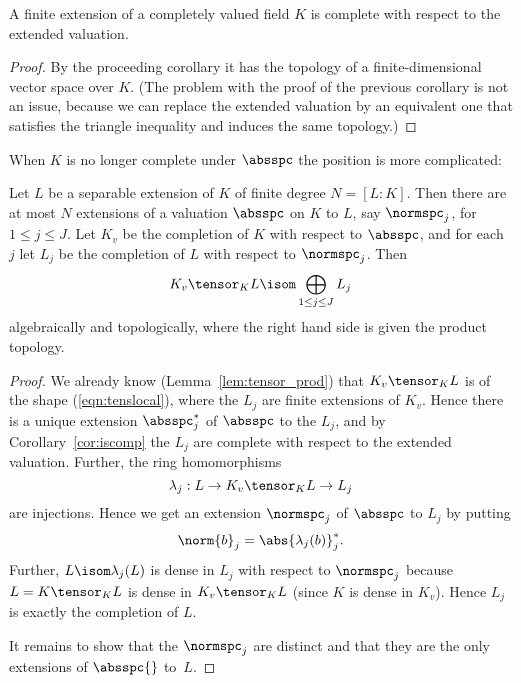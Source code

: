 \documentclass[11pt]{book}
\begin{document}
\begin{ch}
\begin{corollary}\label{cor:iscomp}
A finite extension of a completely valued field $K$ is complete
with respect to the extended valuation.
\end{corollary}
\begin{proof}
By the proceeding corollary it has the topology of a finite-dimensional
vector space over $K$. (The problem with the proof of the previous
corollary is not an issue, because we can replace the extended valuation
by an equivalent one that satisfies the triangle inequality and
induces the same topology.)
\end{proof}

When $K$ is no longer complete under $\absspc$ the position is more complicated:
\begin{theorem}\label{thm:extensions}
Let $L$ be a separable extension of $K$ of finite degree
  $N=[L:K]$.  Then there are at most $N$ extensions of a valuation
  $\absspc$ on $K$ to $L$, say $\normspc_j$, for $1\leq j \leq J$.
  Let $K_v$ be the completion of $K$ with respect to $\absspc$, and for
  each~$j$ let $L_j$ be the completion of $L$ with respect to
  $\normspc_j$.  Then
\begin{equation}\label{eqn:tenslocal}
  K_v \tensor_K L \isom \bigoplus_{1\leq j\leq J} L_j
\end{equation}
algebraically and topologically, where the right hand side is given
the product topology.
\end{theorem}
\begin{proof}
  We already know (Lemma~\ref{lem:tensor_prod}) that $K_v\tensor_K L$
  is of the shape (\ref{eqn:tenslocal}), where the $L_j$ are finite
  extensions of $K_v$.  Hence there is a unique extension
  $\absspc_j^*$ of $\absspc$ to the $L_j$, and by
  Corollary~\ref{cor:iscomp} the $L_j$ are complete with respect to
  the extended valuation.  Further,  the
  ring homomorphisms
  $$
  \lambda_j : L \to K_v\tensor_K L \to L_j
  $$
  are injections.   Hence we get an extension $\normspc_j$ of $\absspc$ to $L_j$ by putting
$$
\norm{b}_j = \abs{\lambda_j(b)}_j^*.
$$
Further, $L\isom \lambda_j(L)$ is dense in $L_j$ with respect to $\normspc_j$ because
$L = K\tensor_K L$ is dense in $K_v\tensor_K L$ (since $K$ is dense
in $K_v$).  Hence $L_j$ is exactly the completion of $L$.

It remains to show that the $\normspc_j$ are distinct and that they
are the only extensions of $\absspc{}$ to~$L$.


\end{proof}
\end{ch}
\end{document}
